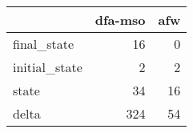 \begin{tabular}{lrr}
\toprule
{} &  dfa-mso &  afw \\
\midrule
final\_state   &       16 &    0 \\
initial\_state &        2 &    2 \\
state         &       34 &   16 \\
delta         &      324 &   54 \\
\bottomrule
\end{tabular}
